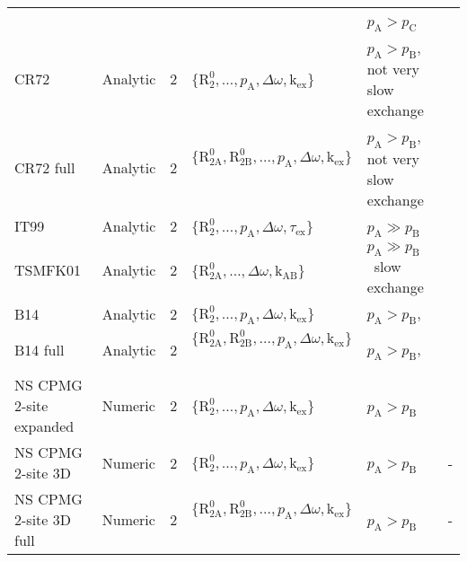 \documentclass[a4paper,11pt,twoside,openright]{book}
\begin{document}
{\begin{landscape}
\begin{center}
\begin{small}
\begin{longtable}{llllll}
                         &          &       &                                                     & $p_{\textrm{A}}> p_{\textrm{C}}$\  \\
CR72                     & Analytic & 2     & $\{\mathrm{R}_2^0, \dots, p_{\textrm{A}}, \Delta\omega , \textrm{k}_{\textrm{ex}}\}$\               & $p_{\textrm{A}}> p_{\textrm{B}}$, not very slow exchange & \citet{CarverRichards72} \\
CR72 full                & Analytic & 2     & $\{\mathrm{R}_{\mathrm{2A}}^0, \mathrm{R}_{\mathrm{2B}}^0, \dots, p_{\textrm{A}}, \Delta\omega , \textrm{k}_{\textrm{ex}}\}$\  & $p_{\textrm{A}}> p_{\textrm{B}}$, not very slow exchange & \citet{CarverRichards72} \\
IT99                     & Analytic & 2     & $\{\mathrm{R}_2^0, \dots, p_{\textrm{A}}, \Delta\omega , \tau_{\textrm{ex}}\}$\               & $p_{\textrm{A}}\gg p_{\textrm{B}}$\                      & \citet{IshimaTorchia99} \\
TSMFK01                  & Analytic & 2     & $\{\mathrm{R}_{\mathrm{2A}}^0, \dots, \Delta\omega , \textrm{k}_{\textrm{AB}}\}$\                   & $p_{\textrm{A}}\gg p_{\textrm{B}}$\  slow exchange       & \citet{Tollinger01} \\
B14                      & Analytic & 2     & $\{\mathrm{R}_2^0, \dots, p_{\textrm{A}}, \Delta\omega , \textrm{k}_{\textrm{ex}}\}$\               & $p_{\textrm{A}}> p_{\textrm{B}}$,                      & \citet{Baldwin2014} \\
B14 full                 & Analytic & 2     & $\{\mathrm{R}_{\mathrm{2A}}^0, \mathrm{R}_{\mathrm{2B}}^0, \dots, p_{\textrm{A}}, \Delta\omega , \textrm{k}_{\textrm{ex}}\}$\  & $p_{\textrm{A}}> p_{\textrm{B}}$,                      & \citet{Baldwin2014} \\
NS CPMG 2-site expanded  & Numeric  & 2     & $\{\mathrm{R}_2^0, \dots, p_{\textrm{A}}, \Delta\omega , \textrm{k}_{\textrm{ex}}\}$\               & $p_{\textrm{A}}> p_{\textrm{B}}$\                        & \citet{Tollinger01} \\
NS CPMG 2-site 3D        & Numeric  & 2     & $\{\mathrm{R}_2^0, \dots, p_{\textrm{A}}, \Delta\omega , \textrm{k}_{\textrm{ex}}\}$\               & $p_{\textrm{A}}> p_{\textrm{B}}$\                        & - \\
NS CPMG 2-site 3D full   & Numeric  & 2     & $\{\mathrm{R}_{\mathrm{2A}}^0, \mathrm{R}_{\mathrm{2B}}^0, \dots, p_{\textrm{A}}, \Delta\omega , \textrm{k}_{\textrm{ex}}\}$\  & $p_{\textrm{A}}> p_{\textrm{B}}$\                        & - \\

\end{longtable}
\end{small}
\end{center}
\end{landscape}}
\end{document}
